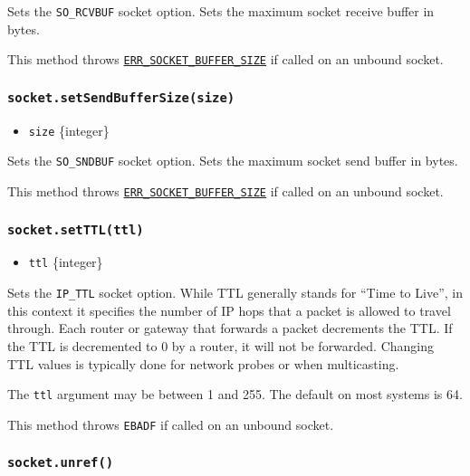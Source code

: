 Sets the \texttt{SO\_RCVBUF} socket option. Sets the maximum socket
receive buffer in bytes.

This method throws
\href{errors.md\#err_socket_buffer_size}{\texttt{ERR\_SOCKET\_BUFFER\_SIZE}}
if called on an unbound socket.

\subsubsection{\texorpdfstring{\texttt{socket.setSendBufferSize(size)}}{socket.setSendBufferSize(size)}}\label{socket.setsendbuffersizesize}

\begin{itemize}
\tightlist
\item
  \texttt{size} \{integer\}
\end{itemize}

Sets the \texttt{SO\_SNDBUF} socket option. Sets the maximum socket send
buffer in bytes.

This method throws
\href{errors.md\#err_socket_buffer_size}{\texttt{ERR\_SOCKET\_BUFFER\_SIZE}}
if called on an unbound socket.

\subsubsection{\texorpdfstring{\texttt{socket.setTTL(ttl)}}{socket.setTTL(ttl)}}\label{socket.setttlttl}

\begin{itemize}
\tightlist
\item
  \texttt{ttl} \{integer\}
\end{itemize}

Sets the \texttt{IP\_TTL} socket option. While TTL generally stands for
``Time to Live'', in this context it specifies the number of IP hops
that a packet is allowed to travel through. Each router or gateway that
forwards a packet decrements the TTL. If the TTL is decremented to 0 by
a router, it will not be forwarded. Changing TTL values is typically
done for network probes or when multicasting.

The \texttt{ttl} argument may be between 1 and 255. The default on most
systems is 64.

This method throws \texttt{EBADF} if called on an unbound socket.

\subsubsection{\texorpdfstring{\texttt{socket.unref()}}{socket.unref()}}\label{socket.unref}

